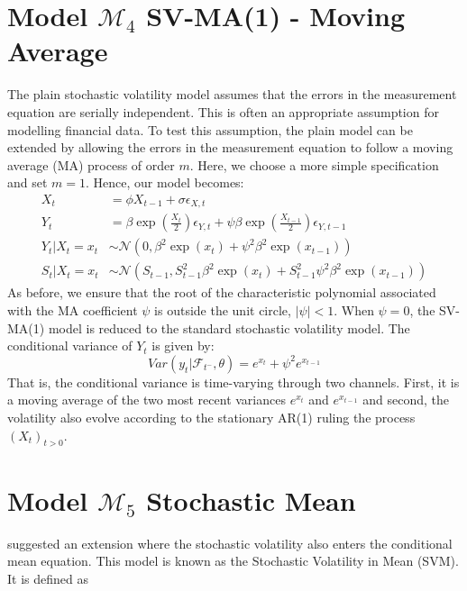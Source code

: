 \documentclass[11pt,a4,twosided,singlespacing,titlepagenumber=on]{scrreprt}
\numberwithin{equation}{chapter} %
\theoremstyle{remark}
\begin{document}
\section{Model $\mathcal{M}_4$ SV-MA(1) - Moving Average}
The plain stochastic volatility model assumes that the errors in the measurement equation are serially independent. This is often an appropriate assumption for modelling financial data. To test this assumption, the plain model can be extended by allowing the errors in the measurement equation to follow a moving average (MA) process of order $m$. Here, we choose a more simple specification and set $m = 1$. Hence, our model becomes:
\begin{align*}
X_t									&= \phi X_{t-1} + \sigma \epsilon_{X,t} \\
Y_t									&= \beta \exp \left( \frac{X_t}{2} \right) \epsilon_{Y,t} + \psi \beta \exp \left( \frac{X_{t-1}}{2} \right) \epsilon_{Y,t-1} \\
Y_t	| X_t = x_t						&\sim \mathcal{N} \left(0, \beta^2 \exp \left( x_t \right) + \psi^2 \beta^2 \exp \left( x_{t-1} \right) \right) \\
S_t | X_t = x_t						&\sim \mathcal{N} \left(S_{t-1}, S_{t-1}^2 \beta^2 \exp \left( x_t \right) +  S_{t-1}^2 \psi^2 \beta^2 \exp \left( x_{t-1} \right) \right)
\end{align*}
As before, we ensure that the root of the characteristic polynomial associated with the MA coefficient $\psi$ is outside the unit circle, $|\psi| < 1$. When $\psi = 0$, the SV-MA(1) model is reduced to the standard stochastic volatility model. The conditional
variance of $Y_t$ is given by:
$$Var \left(y_t | \mathcal{F}_{t^-}, \theta \right) = e^{x_t} + \psi^2 e^{x_{t-1}}$$
That is, the conditional variance is time-varying through two channels. First, it is a moving average of the two most recent variances $e^{x_t}$ and $e^{x_{t-1}}$ and second, the volatility also evolve according to the stationary AR(1) ruling the process $(X_t)_{t>0}$.

\section{Model $\mathcal{M}_5$ Stochastic Mean}
\cite{koopman2002} suggested an extension where the stochastic volatility also enters the conditional mean equation. This model is known as the Stochastic Volatility in Mean (SVM). It is defined as
\end{document}
